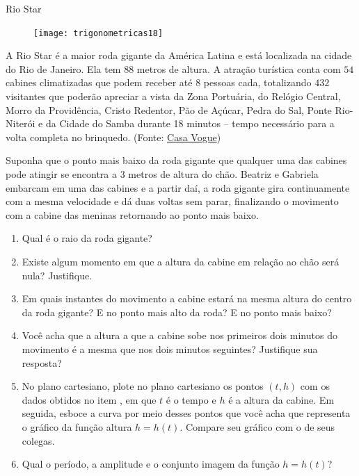 \begin{task}{Rio Star}
\label{trig-ativ4}

\begin{figure}[H]
\centering

\texttt{[image: trigonometricas18]}
\end{figure}

A Rio Star é a maior roda gigante da América Latina e está localizada na cidade do Rio de Janeiro. Ela tem $88$ metros de altura. A atração turística conta com $54$ cabines climatizadas que podem receber até 8 pessoas cada, totalizando $432$ visitantes que poderão apreciar a vista da Zona Portuária, do Relógio Central, Morro da Providência, Cristo Redentor, Pão de Açúcar, Pedra do Sal, Ponte Rio-Niterói e da Cidade do Samba durante 18 minutos – tempo necessário para a volta completa no brinquedo. (Fonte: \href{https://casavogue.globo.com/LazerCultura/Viagem/noticia/2019/12/rio-star-roda-gigante-do-rio-de-janeiro-inaugura-hoje.html}{Casa Vogue})

Suponha que o ponto mais baixo da roda gigante que qualquer uma das cabines pode atingir se encontra a $3$ metros de altura do chão. Beatriz e Gabriela embarcam em uma das cabines e a partir daí, a roda gigante gira continuamente com a mesma velocidade e dá duas voltas sem parar, finalizando o movimento com a cabine das meninas retornando ao ponto mais baixo.

\begin{enumerate}
\item Qual é o raio da roda gigante?
\item Existe algum momento em que a altura da cabine em relação ao chão será nula? Justifique.
\item Em quais instantes do movimento a cabine estará na mesma altura do centro da roda gigante? E no ponto mais alto da roda? E no ponto mais baixo?
\item Você acha que a altura a que a cabine sobe nos primeiros dois minutos do movimento é a mesma que nos dois minutos seguintes? Justifique sua resposta?
\item No plano cartesiano, plote no plano cartesiano os pontos $(t,h)$ com os dados obtidos no item , em que $t$ é o tempo e $h$ é a altura da cabine. Em seguida, esboce a curva por meio desses pontos que você acha que representa o gráfico da função altura $h = h(t)$. Compare seu gráfico com o de seus colegas.
\item Qual o período, a amplitude e o conjunto imagem da função $h = h(t)$?
\end{enumerate}
\end{task}

